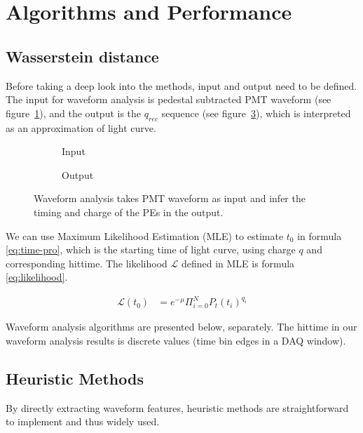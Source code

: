 \section{Algorithms and Performance} %
\label{sec:algorithm}

\subsection{Wasserstein distance}
\label{sec:W-dist}

Before taking a deep look into the methods, input and output need to be defined. The input for waveform analysis is pedestal subtracted PMT waveform (see figure~\ref{fig:input}), and the output is the $q_{rec}$ sequence (see figure~\ref{fig:output}), which is interpreted as an approximation of light curve. 

\begin{figure}[H]
  \begin{subfigure}{.5\textwidth}
    \centering
    \resizebox{\textwidth}{!}{}
    \caption{\label{fig:input} Input}
  \end{subfigure}
  \begin{subfigure}{.5\textwidth}
    \centering
    \resizebox{\textwidth}{!}{}
    \caption{\label{fig:output} Output}
  \end{subfigure}
  \caption{Waveform analysis takes PMT waveform as input and infer the timing and charge of the PEs in the output.}
\end{figure}

We can use Maximum Likelihood Estimation (MLE) to estimate $t_{0}$ in formula \eqref{eq:time-pro}, which is the starting time of light curve, using charge $q$ and corresponding hittime.  The likelihood $\mathcal{L}$ defined in MLE is formula \eqref{eq:likelihood}. 

\begin{align}
  \mathcal{L}(t_{0}) &= e^{-\mu}\Pi_{i=0}^{N}P_{t}(t_{i})^{q_{i}} \label{eq:likelihood}
\end{align}



Waveform analysis algorithms are presented below, separately. The hittime in our waveform analysis results is discrete values (time bin edges in a DAQ window). 

\subsection{Heuristic Methods}
By directly extracting waveform features, heuristic methods are straightforward to implement and thus widely used. 

